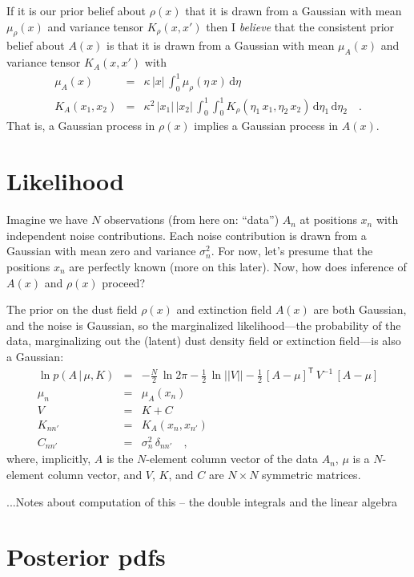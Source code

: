 \documentclass[12pt, letterpaper]{article}
\newcommand{\dd}{\mathrm{d}}
\newcommand{\given}{\,|\,}
\newcommand{\inverse}[1]{{#1}^{-1}}
\newcommand{\transpose}[1]{{#1}^{\mathsf{T}}}
\renewcommand{\det}[1]{||{#1}||}
\begin{document}
If it is our prior belief about $\rho(x)$ that it is drawn from a
Gaussian with mean $\mu_\rho(x)$ and variance tensor $K_\rho(x, x')$ then I
\emph{believe} that the consistent prior belief about $A(x)$ is that
it is drawn from a Gaussian with mean $\mu_A(x)$ and variance tensor
$K_A(x, x')$ with
\begin{eqnarray}
\mu_A(x) &=& \kappa\,|x|\,\int_0^1 \mu_\rho(\eta\,x)\,\dd\eta
\\
K_A(x_1, x_2) &=& \kappa^2\,|x_1|\,|x_2|\,\int_0^1\int_0^1 K_\rho(\eta_1\,x_1, \eta_2\,x_2)\,\dd\eta_1\,\dd\eta_2
\quad .
\end{eqnarray}
That is, a Gaussian process in $\rho(x)$ implies a Gaussian process in
$A(x)$.

\section{Likelihood}

Imagine we have $N$ observations (from here on: ``data'') $A_n$ at
positions $x_n$ with independent noise contributions.
Each noise contribution is drawn from a Gaussian with mean zero and
variance $\sigma^2_n$.
For now, let's presume that the positions $x_n$ are perfectly known
(more on this later).
Now, how does inference of $A(x)$ and $\rho(x)$ proceed?

The prior on the dust field $\rho(x)$ and extinction field $A(x)$ are
both Gaussian, and the noise is Gaussian, so the marginalized
likelihood---the probability of the data, marginalizing out the
(latent) dust density field or extinction field---is also a Gaussian:
\begin{eqnarray}
\ln p(A\given\mu,K) &=& -\frac{N}{2}\,\ln 2\pi - \frac{1}{2}\,\ln\det{V} - \frac{1}{2}\,\transpose{[A-\mu]}\,\inverse{V}\,[A-\mu]
\\
\mu_n &=& \mu_A(x_n)
\\
V &=& K + C
\\
K_{nn'} &=& K_A(x_n, x_{n'})
\\
C_{nn'} &=& \sigma^2_n\,\delta_{nn'}
\quad ,
\end{eqnarray}
where, implicitly, $A$ is the $N$-element column vector of the data $A_n$,
$\mu$ is a $N$-element column vector,
and $V$, $K$, and $C$ are $N\times N$ symmetric matrices.

...Notes about computation of this -- the double integrals and the linear algebra

\section{Posterior pdfs}
\end{document}
